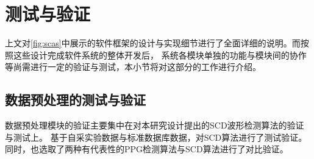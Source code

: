 

\section{测试与验证}
上文对\autoref{fig:scas}中展示的软件框架的设计与实现细节进行了全面详细的说明。而按照这些设计完成软件系统的整体开发后，
系统各模块单独的功能与模块间的协作等尚需进行一定的验证与测试，本小节将对这部分的工作进行介绍。

\subsection{数据预处理的测试与验证}
数据预处理模块的验证主要集中在对本研究设计提出的SCD波形检测算法的验证与测试上。
基于自采实验数据与标准数据库数据\cite{Kachuee2015,ucibp2022}，对SCD算法进行了测试验证。同时，也选取了两种有代表性的PPG检测算法与SCD算法进行了对比验证\cite{Chen2019,cwl,van2019,van20192}。

